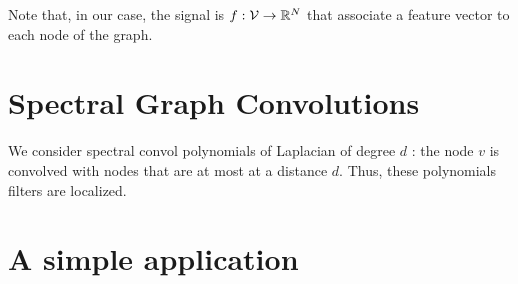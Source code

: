 \documentclass[sigconf]{acmart}
\begin{document}
Note that, in our case, the signal is $f:\mathcal{V}\rightarrow\mathbb{R}^N$ that associate a feature vector to each node of the graph.

\section{Spectral Graph Convolutions }

We consider spectral convol \cite{kipf_semi-supervised_2017}
polynomials of Laplacian of degree $d$ : the node $v$ is convolved with nodes that are at most at a distance $d$. Thus, these polynomials filters are localized.
\section{A simple application}



\end{document}
